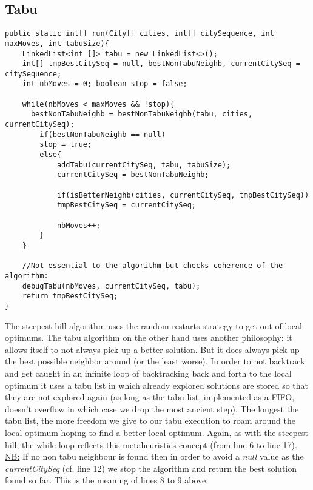\documentclass[./standalone.tex]{subfiles}
\begin{document}
\newpage
	\subsection{Tabu}
\begin{lstlisting}[style=Java, caption={Source code of the tabu algorithm}]
public static int[] run(City[] cities, int[] citySequence, int maxMoves, int tabuSize){
	LinkedList<int []> tabu = new LinkedList<>();
	int[] tmpBestCitySeq = null, bestNonTabuNeighb, currentCitySeq = citySequence;
	int nbMoves = 0; boolean stop = false;
	
	while(nbMoves < maxMoves && !stop){
	  bestNonTabuNeighb = bestNonTabuNeighb(tabu, cities, currentCitySeq);
		if(bestNonTabuNeighb == null)
		stop = true;
		else{
			addTabu(currentCitySeq, tabu, tabuSize);
			currentCitySeq = bestNonTabuNeighb;
			
			if(isBetterNeighb(cities, currentCitySeq, tmpBestCitySeq))
			tmpBestCitySeq = currentCitySeq;
			
			nbMoves++;
		}
	}
	
	//Not essential to the algorithm but checks coherence of the algorithm:
	debugTabu(nbMoves, currentCitySeq, tabu);
	return tmpBestCitySeq;
}
\end{lstlisting}
The steepest hill algorithm uses the random restarts strategy to get out of local optimums. The tabu algorithm on the other hand uses another philosophy: it allows itself to not always pick up a better solution. But it does always pick up the best possible neighbor around (or the least worse). In order to not backtrack and get caught in an infinite loop of backtracking back and forth to the local optimum it uses a tabu list in which already explored solutions are stored so that they are not explored again (as long as the tabu list, implemented as a FIFO, doesn't overflow in which case we drop the most ancient step). The longest the tabu list, the more freedom we give to our tabu execution to roam around the local optimum hoping to find a better local optimum. Again, as with the steepest hill, the while loop reflects this metaheuristics concept (from line 6 to line 17).\\

\underline{NB:} If no non tabu neighbour is found then in order to avoid a \textit{null} value as the \textit{currentCitySeq} (cf. line 12) we stop the algorithm and return the best solution found so far. This is the meaning of lines 8 to 9 above.


	\newpage
\end{document}
